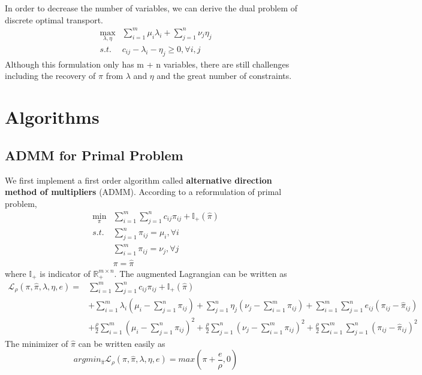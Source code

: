 \documentclass{article}
\begin{document}
In order to decrease the number of variables, we can derive the dual problem of discrete optimal transport.
\begin{equation} \label{Eq:StdLP_dual}
  \begin{aligned}
  \max_{\lambda,\eta} & \sum_{i=1}^{m}\mu_{i}\lambda_{i}+\sum_{j=1}^{n}\nu_{j}\eta_{j}\\
  s.t. & c_{i j}-\lambda_{i}-\eta_{j}\geq0, \forall i, j
  \end{aligned}
\end{equation}
Although this formulation only has m + n variables, there are still challenges including the recovery of $\pi$ from $\lambda$ and $\eta$ and the great number of constraints.
\section{Algorithms}
\subsection{ADMM for Primal Problem}
We first implement a first order algorithm called \textbf{alternative direction method of multipliers} (ADMM). According to a reformulation of primal problem, 
\begin{equation} \label{Eq:StdLP_admm_primal}
  \begin{aligned}
  \min_{\pi} & \sum_{i=1}^{m}\sum_{j=1}^{n} c_{ i j } \pi_{ i j }+\mathbb{I}_{+}(\hat{\pi})\\
  s.t. & \sum_{j=1}^{n}\pi_{ i j } = \mu_i, \forall i\\
  & \sum_{i=1}^{m}\pi_{ i j } = \nu_j, \forall j \\
  & \pi=\hat{\pi}
  \end{aligned}
\end{equation}
where $\mathbb{I}_{+}$ is indicator of $\mathbb{R}^{m\times n}_{+}$. The augmented Lagrangian can be written as 
\begin{equation} \label{Eq:admm_primal}
  \begin{aligned}
\mathcal{L}_{\rho}(\pi,\hat{\pi},\lambda,\eta,e)=&\sum_{i=1}^{m}\sum_{j=1}^{n} c_{ i j } \pi_{ i j }+\mathbb{I}_{+}(\hat{\pi})\\
&+\sum_{i=1}^{m}\lambda_{i}\left(\mu_i-\sum_{j=1}^{n}\pi_{ i j }\right)+\sum_{j=1}^{n}\eta_{j}\left(\nu_j-\sum_{i=1}^{m}\pi_{ i j }\right)+\sum_{i=1}^{m}\sum_{j=1}^{n}e_{ij}\left(\pi_{ij}-\hat{\pi}_{ij}\right)\\
&+\frac{\rho}{2}\sum_{i=1}^{m}\left(\mu_i-\sum_{j=1}^{n}\pi_{ i j }\right)^{2}+\frac{\rho}{2}\sum_{j=1}^{n}\left(\nu_j-\sum_{i=1}^{m}\pi_{ i j }\right)^{2}+\frac{\rho}{2}\sum_{i=1}^{m}\sum_{j=1}^{n}\left(\pi_{ij}-\hat{\pi}_{ij}\right)^{2}
\end{aligned}
\end{equation}
The minimizer of $\hat{\pi}$ can be written easily as
\begin{equation}
  argmin_{\hat{\pi}}\mathcal{L}_{\rho}(\pi,\hat{\pi},\lambda,\eta,e)=max\left(\pi+\frac{e}{\rho}, 0\right)
\end{equation}
\end{document}
